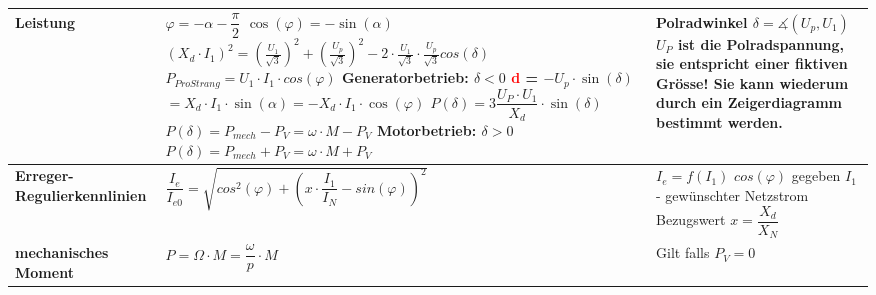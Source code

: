 \begin{longtable}[b]{| C{5cm}| P{8.5cm} | P{5 cm} |}
        \textbf{Leistung} \newline
         &
        $\varphi = -\alpha - \dfrac{\pi}{2}$ \newline
        $\cos(\varphi) = -\sin(\alpha)$ \newline
       	$ (X_d \cdot I_1)^2=(\frac{U_1}{\sqrt{3}})^2+(\frac{U_p}{\sqrt{3}})^2 - 2\cdot \frac{U_1}{\sqrt{3}}\cdot \frac{U_p}{\sqrt{3}} cos(\delta) $ \newline \newline
       	$P_{Pro Strang} = U_1\cdot I_1\cdot cos(\varphi)$ \newline
        \textbf{Generatorbetrieb:} $\delta < 0$ \newline
        \textcolor{red}{d} = $-U_p\cdot\sin(\delta)$ \newline
        \qquad $= X_d\cdot I_1\cdot\sin(\alpha) = -X_d\cdot I_1\cdot\cos(\varphi)$ \newline \newline
        $P(\delta) = 3\dfrac{U_P\cdot U_1}{X_d}\cdot\sin(\delta)$ \newline \newline
        $P(\delta) = P_{mech}-P_V = \omega\cdot M - P_V$ \newline \newline
        \textbf{Motorbetrieb:} $\delta > 0$ \newline
        $P(\delta) = P_{mech} + P_V = \omega\cdot M + P_V$ &
        Polradwinkel $\delta =  \measuredangle (U_p, U_1)$  \newline \newline
        $U_P$ ist die Polradspannung, sie entspricht einer fiktiven Grösse! Sie kann wiederum durch ein Zeigerdiagramm bestimmt werden.
        \\ \hline
		\textbf{Erreger-Regulierkennlinien} & 
		$ \dfrac{I_e}{I_{e0}} = \sqrt{cos^2(\varphi) + \left(x\cdot\dfrac{I_1}{I_N}-sin(\varphi)\right)^2}$ & $I_e = f(I_1)$ \newline $cos(\varphi)$ gegeben \newline $I_1$ - gewünschter Netzstrom \newline Bezugswert $x = \dfrac{X_d}{X_N}$ 
		\\ \hline
		\textbf{mechanisches Moment} &  $P = \Omega\cdot M = \dfrac{\omega}{p}\cdot M$ & Gilt falls $P_V = 0$ 
		\\ \hline
	
	    \end{longtable}
    
